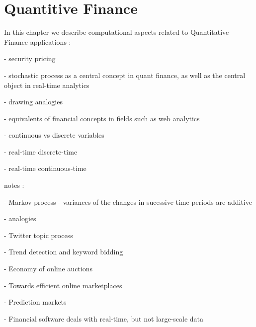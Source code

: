 %

\section{Quantitive Finance}

In this chapter we describe computational aspects related to Quantitative Finance applications :

- security pricing

- stochastic process as a central concept in quant finance, as well as the central object in real-time analytics

- drawing analogies

- equivalents of financial concepts in fields such as web analytics

- continuous vs discrete variables

- real-time discrete-time

- real-time continuous-time


notes :

- Markov process - variances of the changes in sucessive time periods are additive


- analogies

- Twitter topic process

- Trend detection and keyword bidding

- Economy of online auctions

- Towards efficient online marketplaces

- Prediction markets

- Financial software deals with real-time, but not large-scale data



%
